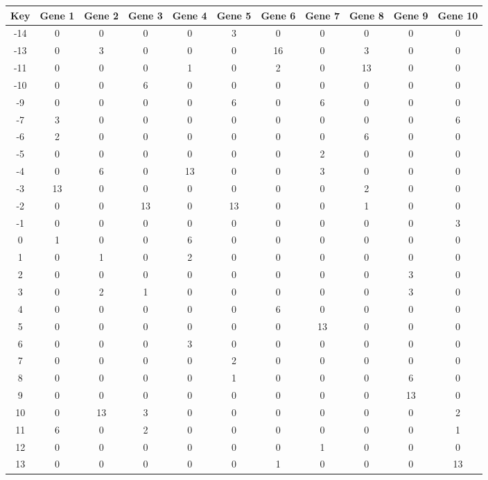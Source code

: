 \begin{tabular}{|c|c|c|c|c|c|c|c|c|c|c|}
\hline
Key & Gene 1 & Gene 2 & Gene 3 & Gene 4 & Gene 5 & Gene 6 & Gene 7 & Gene 8 & Gene 9 & Gene 10 \\
\hline
-14 & 0 & 0 & 0 & 0 & 3 & 0 & 0 & 0 & 0 & 0 \\
-13 & 0 & 3 & 0 & 0 & 0 & 16 & 0 & 3 & 0 & 0 \\
-11 & 0 & 0 & 0 & 1 & 0 & 2 & 0 & 13 & 0 & 0 \\
-10 & 0 & 0 & 6 & 0 & 0 & 0 & 0 & 0 & 0 & 0 \\
-9 & 0 & 0 & 0 & 0 & 6 & 0 & 6 & 0 & 0 & 0 \\
-7 & 3 & 0 & 0 & 0 & 0 & 0 & 0 & 0 & 0 & 6 \\
-6 & 2 & 0 & 0 & 0 & 0 & 0 & 0 & 6 & 0 & 0 \\
-5 & 0 & 0 & 0 & 0 & 0 & 0 & 2 & 0 & 0 & 0 \\
-4 & 0 & 6 & 0 & 13 & 0 & 0 & 3 & 0 & 0 & 0 \\
-3 & 13 & 0 & 0 & 0 & 0 & 0 & 0 & 2 & 0 & 0 \\
-2 & 0 & 0 & 13 & 0 & 13 & 0 & 0 & 1 & 0 & 0 \\
-1 & 0 & 0 & 0 & 0 & 0 & 0 & 0 & 0 & 0 & 3 \\
0 & 1 & 0 & 0 & 6 & 0 & 0 & 0 & 0 & 0 & 0 \\
1 & 0 & 1 & 0 & 2 & 0 & 0 & 0 & 0 & 0 & 0 \\
2 & 0 & 0 & 0 & 0 & 0 & 0 & 0 & 0 & 3 & 0 \\
3 & 0 & 2 & 1 & 0 & 0 & 0 & 0 & 0 & 3 & 0 \\
4 & 0 & 0 & 0 & 0 & 0 & 6 & 0 & 0 & 0 & 0 \\
5 & 0 & 0 & 0 & 0 & 0 & 0 & 13 & 0 & 0 & 0 \\
6 & 0 & 0 & 0 & 3 & 0 & 0 & 0 & 0 & 0 & 0 \\
7 & 0 & 0 & 0 & 0 & 2 & 0 & 0 & 0 & 0 & 0 \\
8 & 0 & 0 & 0 & 0 & 1 & 0 & 0 & 0 & 6 & 0 \\
9 & 0 & 0 & 0 & 0 & 0 & 0 & 0 & 0 & 13 & 0 \\
10 & 0 & 13 & 3 & 0 & 0 & 0 & 0 & 0 & 0 & 2 \\
11 & 6 & 0 & 2 & 0 & 0 & 0 & 0 & 0 & 0 & 1 \\
12 & 0 & 0 & 0 & 0 & 0 & 0 & 1 & 0 & 0 & 0 \\
13 & 0 & 0 & 0 & 0 & 0 & 1 & 0 & 0 & 0 & 13 \\
\hline
\end{tabular}